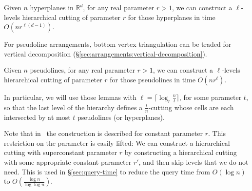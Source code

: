 \begin{lemma}\label{lem:hierarchical-cutting-d}
Given \(n\) hyperplanes in \(\mathbb{R}^d\), for any real parameter \(r >
1\), we can construct a \(\ell\)-levels hierarchical cutting of parameter
\(r\) for those hyperplanes in time \(O(nr^{\ell(d-1)})\).
\end{lemma}

For pseudoline arrangements, bottom vertex triangulation can be traded for
vertical decomposition
(\S\ref{sec:arrangements:vertical-decomposition}).
\begin{lemma}\label{lem:hierarchical-cutting-2}
Given \(n\) pseudolines, for any real parameter \(r > 1\), we can construct
a \(\ell\)-levels hierarchical cutting of parameter
\(r\) for those pseudolines in time \(O(nr^\ell)\).
\end{lemma}

In particular, we will use those lemmas with
\(\ell = \lceil \log_r \frac nt \rceil\),
for some parameter \(t\),
so that the last level of the hierarchy defines a \(\frac
tn\)-cutting whose cells are each intersected by at most \(t\) pseudolines (or
hyperplanes).

Note that in~\cite{C93} the construction is described for constant
parameter \(r\).
This restriction on the parameter is easily lifted:
We can construct a hierarchical
cutting with superconstant parameter \(r\) by constructing a hierarchical
cutting with some appropriate constant parameter \(r'\), and then skip levels that we do
not need. This is used in \S\ref{sec:query-time} to reduce the query time
from \(O(\log n)\) to \(O(\frac{\log n}{\log \log n})\).
